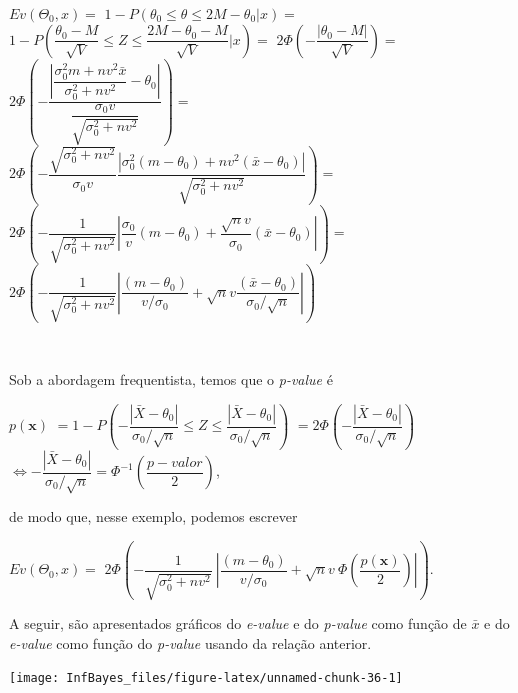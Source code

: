 \documentclass[
]{book}
\begin{document}
\(Ev(\Theta_0,x)=\) \(1-P\left(\theta_0\leq \theta\leq2M-\theta_0|x\right)=\) \(1-P\left(\dfrac{\theta_0-M}{\sqrt V}\leq Z\leq \dfrac{2M-\theta_0-M}{\sqrt V}|x\right)=\) \(2\Phi\left(-\dfrac{|\theta_0-M|}{\sqrt V}\right)=\) \(2\Phi\left(-\dfrac{\left|\dfrac{{\sigma}_0^2m+nv^2\bar{x}}{{\sigma}_0^2+nv^2}-\theta_0\right|}{\dfrac{{\sigma}_0 v}{\sqrt{{\sigma}_0^2+nv^2}}}\right)=\) \(2\Phi\left(-\dfrac{\sqrt{{\sigma}_0^2+nv^2}}{{\sigma}_0 v}\dfrac{|{\sigma}_0^2(m-\theta_0)+nv^2(\bar x-\theta_0)|}{\sqrt{{\sigma}_0^2+nv^2}}\right)=\) \(2\Phi\left(-\dfrac{1}{\sqrt{{\sigma}_0^2+nv^2}}\left|\dfrac{{\sigma}_0}{v}(m-\theta_0)+\dfrac{\sqrt n v}{{\sigma}_0}(\bar x-\theta_0)\right|\right)=\) \(2\Phi\left(-\dfrac{1}{\sqrt{{\sigma}_0^2+nv^2}}\left|\dfrac{(m-\theta_0)}{v/{\sigma}_0}+\sqrt nv\dfrac{(\bar x-\theta_0)}{{\sigma}_0/\sqrt n}\right|\right)\)

\(~\)

Sob a abordagem frequentista, temos que o \emph{p-value} é

\(p(\boldsymbol x)\)
\(= 1-P\left(-\dfrac{|\bar X-\theta_0|}{{\sigma}_0/\sqrt n}\leq Z \leq \dfrac{|\bar X-\theta_0|}{{\sigma}_0/\sqrt n}\right)\)
\(=2\Phi\left(-\dfrac{|\bar X-\theta_0|}{{\sigma}_0/\sqrt n}\right)\)
\(\Longleftrightarrow -\dfrac{|\bar X-\theta_0|}{{\sigma}_0/\sqrt n}=\Phi^{-1}\left(\dfrac{p-valor}{2}\right)\),

de modo que, nesse exemplo, podemos escrever

\(Ev(\Theta_0,x)=\) \(2\Phi\left(-\dfrac{1}{\sqrt{{\sigma}_0^2+nv^2}}~\left|\dfrac{(m-\theta_0)}{v/{\sigma}_0}+\sqrt nv~\Phi\left(\dfrac{p(\boldsymbol x)}{2}\right)\right|\right)\).

A seguir, são apresentados gráficos do \emph{e-value} e do \emph{p-value} como função de \(\bar{x}\) e do \emph{e-value} como função do \emph{p-value} usando da relação anterior.

\begin{center}\texttt{[image: InfBayes\_files/figure-latex/unnamed-chunk-36-1]} \end{center}
\end{document}
